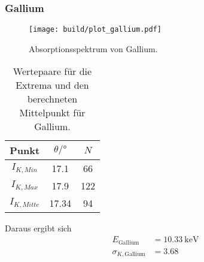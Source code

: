 \clearpage
\subsubsection*{Gallium}
\begin{figure}[H]
    \centering
    \texttt{[image: build/plot\_gallium.pdf]}
    \caption{Absorptionsspektrum von Gallium.}
    \label{fig:gallium}
\end{figure}
\begin{table}[H]                                                                                   
    \centering                                                                                     
        \caption{Wertepaare für die Extrema und den berechneten Mittelpunkt für Gallium.}                      
        \label{tab:Ga}                                                                        
        \begin{tabular}{S S[table-format=2.2] S}                                                   
          \toprule                                                                                 
          {Punkt} & {$\theta /\si{\degree}$} & {$N$}\\                                            
          \midrule                                                                                 
          {$I_{K,Min  }$} &17.1&66\\
          {$I_{K,Max  }$} &17.9&122\\
          {$I_{K,Mitte}$} &17.34&94\\
          \bottomrule                                                                              
        \end{tabular}                                                                              
      \end{table}                                                                                  
Daraus ergibt sich                                                                                 
\begin{align*}                                                                                     
    E_\text{Gallium} &= \SI{10.33}{\kilo\electronvolt}\\                  
    \sigma_{K, \text{Gallium}} &= \num{3.68}                      
\end{align*}                                                                                       

